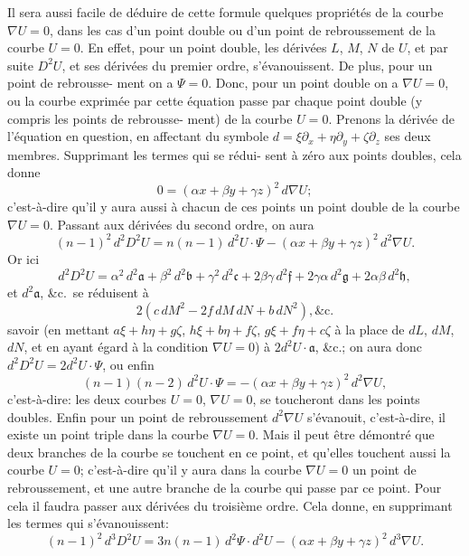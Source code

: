 \documentclass[11pt]{article}
\begin{document}
\medskip
Il sera aussi facile de d\'eduire de cette formule quelques propri\'et\'es de la courbe
$\nabla U = 0$, dans les cas d'un point double ou d'un point de rebroussement de la courbe
$U = 0$. En effet, pour un point double, les d\'eriv\'ees $L$, $M$, $N$ de $U$, et par suite $D^{2} U$,
et ses d\'eriv\'ees du premier ordre, s'\'evanouissent. De plus, pour un point de rebrousse-
ment on a $\Psi = 0$. Donc, pour un point double on a $\nabla U = 0$, ou la courbe exprim\'ee
par cette \'equation passe par chaque point double (y compris les points de rebrousse-
ment) de la courbe $U = 0$. Prenons la d\'eriv\'ee de l'\'equation en question, en affectant
du symbole $d = \xi \partial_{x} + \eta \partial_{y} + \zeta \partial_{z}$ ses deux membres. Supprimant les termes qui se r\'edui-
sent \`a z\'ero aux points doubles, cela donne
\[
0 = (\alpha x + \beta y + \gamma z)^{2}\,d \nabla U;
\]
c'est-\`a-dire qu'il y aura aussi \`a chacun de ces points un point double de la courbe
$\nabla U = 0$. Passant aux d\'eriv\'ees du second ordre, on aura
\[
(n - 1)^{2}\,d^{2} D^{2} U = n(n - 1)\,d^{2} U \cdot \Psi - (\alpha x + \beta y + \gamma z)^{2}\,d^{2} \nabla U.
\]
Or ici
\[
d^{2} D^{2} U = \alpha^{2}\,d^{2}\mathfrak{a} + \beta^{2}\,d^{2}\mathfrak{b} + \gamma^{2}\,d^{2}\mathfrak{c} + 2\beta\gamma\,d^{2}\mathfrak{f} + 2\gamma\alpha\,d^{2}\mathfrak{g} + 2\alpha\beta\,d^{2}\mathfrak{h},
\]
et $d^{2}\mathfrak{a}$, \&c.\ se r\'eduisent \`a
\[
2(c\,d M^{2} - 2 f\,d M\,d N + b\,d N^{2}), \&\text{c.}
\]
savoir (en mettant $a \xi + h \eta + g \zeta$, $h \xi + b \eta + f \zeta$, $g \xi + f \eta + c \zeta$ \`a la place de $d L$, $d M$, $d N$, et en
ayant \'egard \`a la condition $\nabla U = 0$) \`a $2 d^{2} U \cdot \mathfrak{a}$, \&c.; on aura donc $d^{2} D^{2} U = 2 d^{2} U \cdot \Psi$, ou enfin
\[
(n - 1)(n - 2)\,d^{2} U \cdot \Psi = -(\alpha x + \beta y + \gamma z)^{2}\,d^{2} \nabla U,
\]
c'est-\`a-dire: les deux courbes $U = 0$, $\nabla U = 0$, se toucheront dans les points doubles.
Enfin pour un point de rebroussement $d^{2} \nabla U$ s'\'evanouit, c'est-\`a-dire, il existe un point
triple dans la courbe $\nabla U = 0$. Mais il peut \^etre d\'emontr\'e que deux branches de la
courbe se touchent en ce point, et qu'elles touchent aussi la courbe $U = 0$; c'est-\`a-dire
qu'il y aura dans la courbe $\nabla U = 0$ un point de rebroussement, et une autre branche
de la courbe qui passe par ce point. Pour cela il faudra passer aux d\'eriv\'ees du
troisi\`eme ordre. Cela donne, en supprimant les termes qui s'\'evanouissent:
\[
(n - 1)^{2}\,d^{3} D^{2} U = 3 n(n - 1)\,d^{2}\Psi \cdot d^{2} U - (\alpha x + \beta y + \gamma z)^{2}\,d^{3} \nabla U.
\]
\end{document}
